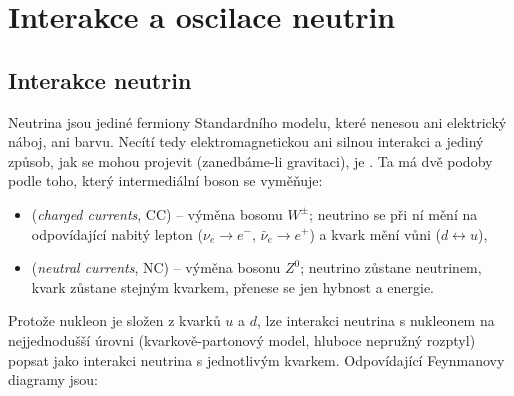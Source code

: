 \section{Interakce a oscilace neutrin}

\subsection{Interakce neutrin}

Neutrina jsou jediné fermiony Standardního modelu, které nenesou ani elektrický náboj, ani barvu. Necítí tedy elektromagnetickou ani silnou interakci a jediný způsob, jak se mohou projevit (zanedbáme-li gravitaci), je . Ta má dvě podoby podle toho, který intermediální boson se vyměňuje:
\begin{itemize}[nosep]
  \item {} (\emph{charged currents}, CC) -- výměna bosonu \(W^\pm\); neutrino se při ní mění na odpovídající nabitý lepton (\(\nu_e\to e^-\), \(\bar\nu_e\to e^+\)) a kvark mění vůni (\(d\leftrightarrow u\)),
  \item {} (\emph{neutral currents}, NC) -- výměna bosonu \(Z^0\); neutrino zůstane neutrinem, kvark zůstane stejným kvarkem, přenese se jen hybnost a energie.
\end{itemize}
Protože nukleon je složen z kvarků \(u\) a \(d\), lze interakci neutrina s nukleonem na nejjednodušší úrovni (kvarkově-partonový model, hluboce nepružný rozptyl) popsat jako interakci neutrina s jednotlivým kvarkem. Odpovídající Feynmanovy diagramy jsou:

